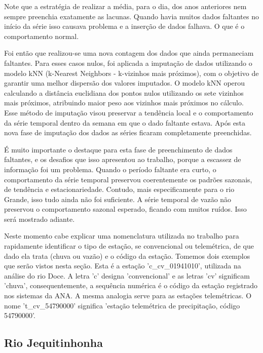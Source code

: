 Note que a estratégia de realizar a média, para o dia, dos anos anteriores nem sempre preenchia exatamente as lacunas. Quando havia muitos dados faltantes no início da série isso causava problema e a inserção de dados falhava. O que é o comportamento normal.

Foi então que realizou-se uma nova contagem dos dados que ainda permaneciam faltantes. Para esses casos nulos, foi aplicada a imputação de dados utilizando o modelo kNN (k-Nearest Neighbors - k-vizinhos mais próximos), com o objetivo de garantir uma melhor dispersão dos valores imputados. O modelo kNN operou calculando a distância euclidiana dos pontos nulos utilizando os sete vizinhos mais próximos, atribuindo maior peso aos vizinhos mais próximos no cálculo. Esse método de imputação visou preservar a tendência local e o comportamento da série temporal dentro da semana em que o dado faltante estava. Após esta nova fase de imputação dos dados as séries ficaram completamente preenchidas.

É muito importante o destaque para esta fase de preenchimento de dados faltantes, e os desafios que isso apresentou ao trabalho, porque a escassez de informação foi um problema. Quando o período faltante era curto, o comportamento da série temporal preservou coerentemente os padrões sazonais, de tendência e estacionariedade. Contudo, mais especificamente para o rio Grande, isso tudo ainda não foi suficiente. A série temporal de vazão não preservou o comportamento sazonal esperado, ficando com muitos ruídos. Isso será mostrado adiante.

Neste momento cabe explicar uma nomenclatura utilizada no trabalho para rapidamente identificar o tipo de estação, se convencional ou telemétrica, de que dado ela trata (chuva ou vazão) e o código da estação. Tomemos dois exemplos que serão vistos nesta seção. Esta é a estação 'c\_cv\_01941010', utilizada na análise do rio Doce. A letra 'c' designa 'convencional' e as letras 'cv' significam 'chuva', consequentemente, a sequência numérica é o código da estação registrado nos sistemas da ANA. A mesma analogia serve para as estações telemétricas. O nome 't\_cv\_54790000' significa 'estação telemétrica de precipitação, código 54790000'.

\subsection{Rio Jequitinhonha}

